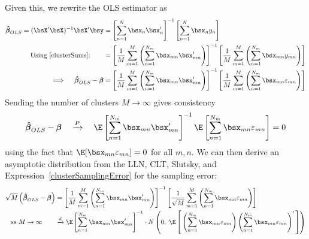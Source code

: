 \documentclass[12pt]{article}
\theoremstyle{plain}
\theoremstyle{definition}
\theoremstyle{remark}
\newcommand{\ra}{\rightarrow}
\newcommand{\bsSigma}{\boldsymbol{\Sigma}}
\newcommand{\bsbeta}{\boldsymbol{\beta}}
\newcommand{\bshatbeta}{\boldsymbol{\hat{\beta}}}
\newcommand{\bshatSigma}{\boldsymbol{\hat{\Sigma}}}
\newcommand{\pto}{\xrightarrow{P}}
\newcommand{\dto}{\xrightarrow{d}}
\newcommand{\sumnN}{\sum^N_{n=1}}
\begin{document}
Given this, we rewrite the OLS estimator as
\begin{align}
  \bshatbeta_{OLS}
  = (\bsX'\bsX)^{-1}\bsX'\bsy
  &=
  \left[
    \sumnN \bsx_n\bsx_n'
  \right]^{-1}
  \left[
    \sumnN
    \bsx_ny_n
  \right] \notag\\
  \text{Using~\ref{clusterSums}:}\qquad
  &=
  \left[
    \frac{1}{M}
    \sum_{m=1}^M \left(\sum_{n=1}^{N_m} \bsx_{mn}\bsx_{mn}'\right)
  \right]^{-1}
  \left[
    \frac{1}{M}
    \sum_{m=1}^M \left(\sum_{n=1}^{N_m} \bsx_{mn}y_{mn} \right)
  \right] \notag\\
  \implies\quad
  \bshatbeta_{OLS} - \bsbeta
  &=
  \left[
    \frac{1}{M}
    \sum_{m=1}^M \left(\sum_{n=1}^{N_m} \bsx_{mn}\bsx_{mn}'\right)
  \right]^{-1}
  \left[
    \frac{1}{M}
    \sum_{m=1}^M \left(\sum_{n=1}^{N_m} \bsx_{mn}\varepsilon_{mn} \right)
  \right]
  \label{clusterSamplingError}
\end{align}
Sending the number of clusters $M\ra\infty$ gives consistency
\begin{align*}
  \bshatbeta_{OLS} - \bsbeta
  \quad\pto\quad
    \E\left[\sum_{n=1}^{N_m} \bsx_{mn}\bsx_{mn}'\right]^{-1}
    \E\left[\sum_{n=1}^{N_m} \bsx_{mn}\varepsilon_{mn} \right]
  = 0
\end{align*}
using the fact that $\E[\bsx_{mn}\varepsilon_{mn}]=0$ for all $m,n$.
We can then derive an asymptotic distribution from the LLN, CLT,
Slutsky, and Expression~\ref{clusterSamplingError} for the sampling
error:
\begin{align*}
  \sqrt{M}\left(\bshatbeta_{OLS} - \bsbeta\right)
  &=
  \left[
    \frac{1}{M}
    \sum_{m=1}^M \left(\sum_{n=1}^{N_m} \bsx_{mn}\bsx_{mn}'\right)
  \right]^{-1}
  \left[
    \frac{1}{\sqrt{M}}
    \sum_{m=1}^M \left(\sum_{n=1}^{N_m} \bsx_{mn}\varepsilon_{mn} \right)
  \right] \\
  \text{as $M\ra\infty$}\qquad
  &\dto
  \E\left[\sum_{n=1}^{N_m} \bsx_{mn}\bsx_{mn}'\right]^{-1}
  \cdot
  N\left(0,\;
    \E\left[\,
      \left(\sum_{n=1}^{N_m} \bsx_{mn}\varepsilon_{mn}\right)
      \left(\sum_{n=1}^{N_m} \bsx_{mn}\varepsilon_{mn}\right)'
    \, \right]
  \right)
\end{align*}
\end{document}
